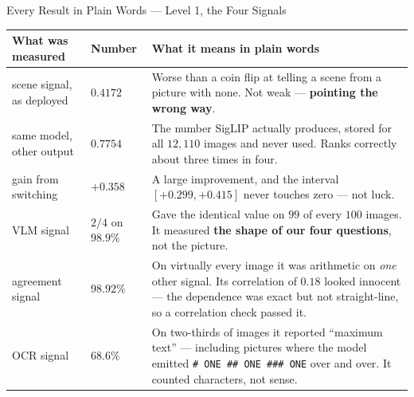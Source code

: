 \documentclass[aspectratio=169,11pt]{beamer}
\begin{document}
\begin{frame}{Every Result in Plain Words --- Level 1, the Four Signals}
\tiny
\begin{center}
\begin{tabular}{@{}p{2.7cm} l p{7.3cm}@{}}
\toprule
\textbf{What was measured} & \textbf{Number} & \textbf{What it means in plain words} \\
\midrule
scene signal, as deployed & $0.4172$ & Worse than a coin flip at telling a scene from a picture with none. Not weak --- \textbf{pointing the wrong way}. \\
\addlinespace
same model, other output & $0.7754$ & The number SigLIP actually produces, stored for all $12{,}110$ images and never used. Ranks correctly about three times in four. \\
\addlinespace
gain from switching & $+0.358$ & A large improvement, and the interval $[+0.299, +0.415]$ never touches zero --- not luck. \\
\addlinespace
VLM signal & $2/4$ on $98.9\%$ & Gave the identical value on $99$ of every $100$ images. It measured \textbf{the shape of our four questions}, not the picture. \\
\addlinespace
agreement signal & $98.92\%$ & On virtually every image it was arithmetic on \emph{one} other signal. Its correlation of $0.18$ looked innocent --- the dependence was exact but not straight-line, so a correlation check passed it. \\
\addlinespace
OCR signal & $68.6\%$ & On two-thirds of images it reported ``maximum text'' --- including pictures where the model emitted \texttt{\# ONE \#\# ONE \#\#\# ONE} over and over. It counted characters, not sense. \\
\bottomrule
\end{tabular}
\end{center}
\end{frame}
\end{document}
